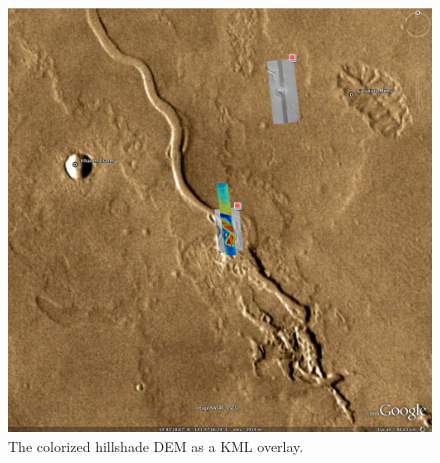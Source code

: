 \begin{figure}
\begin{center}
\includegraphics[width=5in]{images/p19-googlemars.png}
\caption[Hrad shaded colorized DEM as a KML overlay] {
    \label{hrad-kml}
        The colorized hillshade DEM as a KML overlay.
    }
\end{center}
\end{figure}





